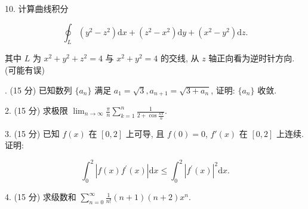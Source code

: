 \documentclass{examcollection}
\renewcommand{\displayformula}[1]{\[#1\]}
\begin{document}
{\begin{minipage}{\textwidth}
10. 计算曲线积分\par
\displayformula{\oint_ {L} \left(y ^ {2} - z ^ {2}\right) \mathrm{d} x + \left(z ^ {2} - x ^ {2}\right) \mathrm{d} y + \left(x ^ {2} - y ^ {2}\right) \mathrm{d} z.}\par
其中 $L$ 为 $x^{2} + y^{2} + z^{2} = 4$ 与 $x^{2} + y^{2} = 4$ 的交线, 从 $z$ 轴正向看为逆时针方向. (可能有误)\par
{}. (15 分) 已知数列 $\{a_{n}\}$ 满足 $a_{1} = \sqrt{3}, a_{n+1} = \sqrt{3 + a_{n}}$, 证明: $\{a_{n}\}$ 收敛.\par
2. (15 分) 求极限 $\lim_{n\to \infty}\frac{\pi}{n}\sum_{k = 1}^{n}\frac{1}{2 + \cos\frac{k\pi}{n}}.$\par
3. (15 分) 已知 $f(x)$ 在 $[0,2]$ 上可导, 且 $f(0) = 0$, $f'(x)$ 在 $[0,2]$ 上连续. 证明:\par
\displayformula{\int_ {0} ^ {2} | f (x) f ^ {\prime} (x) | \mathrm{d} x \leq \int_ {0} ^ {2} | f ^ {\prime} (x) | ^ {2} \mathrm{d} x.}\par
4. (15 分) 求级数和 $\sum_{n=0}^{\infty} \frac{1}{n!}(n+1)(n+2)x^{n}$.\par
\end{minipage}}
\ifdim\dimexpr\ht\proofbox+\dp\proofbox\relax>\textheight
\noindent\resizebox{!}{\textheight}{\usebox{\proofbox}}\else\noindent\usebox{\proofbox}\fi\clearpage
\end{document}
